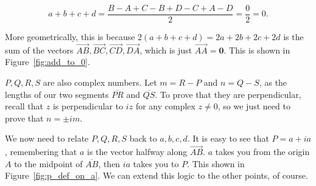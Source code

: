 \documentclass[../gatm.tex]{subfiles}
\begin{document}
$$a+b+c+d=\frac{B-A+C-B+D-C+A-D}{2}=\frac{0}{2}=0.$$

\noindent More geometrically, this is because $2(a+b+c+d)=2a+2b+2c+2d$ is the sum of the vectors $\overrightarrow{AB}, \overrightarrow{BC}, \overrightarrow{CD}, \overrightarrow{DA}$, which is just $\overrightarrow{AA}=\mathbf{0}$. This is shown in Figure~\ref{fig:add_to_0}.

$P,Q,R,S$ are also complex numbers. Let $m=R-P$ and $n = Q-S$, as the lengths of our two segments $\overline{PR}$ and $\overline{QS}$. To prove that they are perpendicular, recall that $z$ is perpendicular to $iz$ for any complex $z\neq 0$, so we just need to prove that $n=\pm im$.

We now need to relate $P,Q,R,S$ back to $a,b,c,d$. It is easy to see that $P = a+ia$, remembering that $a$ is the vector halfway along $\overrightarrow{AB}$. $a$ takes you from the origin $A$ to the midpoint of $\overline{AB}$, then $ia$ takes you to $P$. This shown in Figure~\ref{fig:p_def_on_a}. We can extend this logic to the other points, of course.

\end{document}
